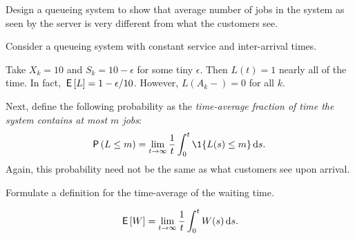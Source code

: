 \begin{exercise}
Design a queueing system to show that average number of jobs in the system as seen by the server is very different from what the customers see.
  \begin{hint}
Consider a queueing system with constant service and inter-arrival times.
  \end{hint}
\begin{solution}
  Take $X_k = 10$ and $S_k = 10-\epsilon$ for some tiny
  $\epsilon$. Then $L(t) = 1$ nearly all of the time. In fact,
  $\,\mathsf{E}\left[L\right] = 1-\epsilon/10$. However, $L(A_k-)=0$ for all $k$.
\end{solution}
\end{exercise}

Next, define the following probability as the
\emph{time-average fraction of time the system contains at most $m$
  jobs}:
\begin{equation}
  \label{eq:47}
  \P{L\leq m} =\lim_{t\to\infty} \frac 1 t\int_0^t \1{L(s)\leq m} \d s.
\end{equation}
Again, this probability need not be the same as what customers see
upon arrival.  

\begin{exercise}
Formulate a definition  for the  time-average of the waiting time.
\begin{solution}
  \begin{equation*}
    \,\mathsf{E}\left[W\right] = \lim_{t\to\infty} \frac1t \int_0^t W(s) \,\text{d}s.
  \end{equation*}
\end{solution}
\end{exercise}



